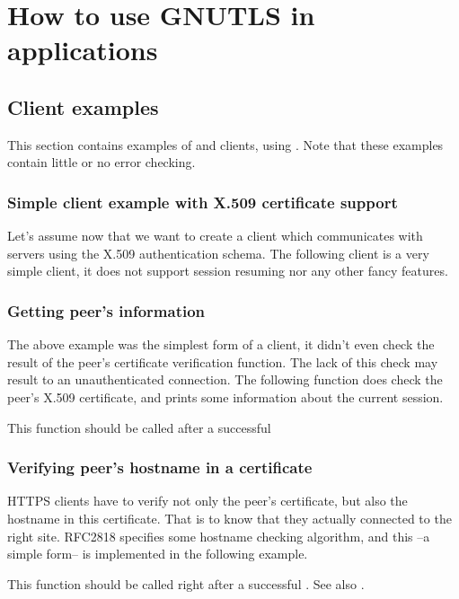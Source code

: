 \chapter{How to use GNUTLS in applications}
\label{examples}

\section{Client examples}
This section contains examples of \tls{} and \ssl{} clients, using \gnutls{}. 
Note that these examples contain little or no error checking.

\subsection{Simple client example with X.509 certificate support}
Let's assume now that we want to create a client which communicates
with servers using the X.509 authentication schema. The following client
is a very simple \tls{} client, it does not support session resuming nor
any other fancy features.


\subsection{Getting peer's information}
\par The above example was the simplest form of a client, it didn't even check
the result of the peer's certificate verification function. The lack of
this check may result to an unauthenticated connection.
The following function does check the peer's
X.509 certificate, and prints some information about the current session.
\par
This function should be called after a successful



\subsection{Verifying peer's hostname in a certificate}
\par HTTPS clients have to verify not only the peer's certificate,
but also the hostname in this certificate. That is to know that
they actually connected to the right site.
RFC2818 specifies some hostname checking algorithm, and this --a simple form--
is implemented in the following example.

\par
This function should be called right after a successful
.
See also
.

